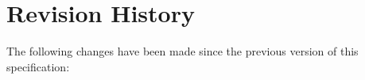 \chapter{Revision History}
The following changes have been made since the previous version
of this specification:

\begin{longtable}{ | c | c | c | p{} | }
\hline
\hline
\endhead

\end{longtable}
